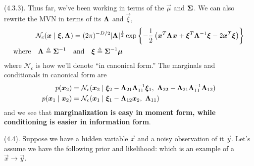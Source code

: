 \documentclass[11pt]{article}
\begin{document}
\myspace
\p {} (4.3.3). Thus far, we've been working in terms of the  $\vec\mu$ and $\matr\Sigma$. We can also rewrite the MVN in terms of its  $\matr\Lambda$ and $\vec\xi$,
\begin{align}
	\mathcal{N}_c(\vec x \mid \vec\xi, \matr\Lambda)
		&= (2\pi)^{-D/2} | \matr\Lambda |^{\onehalf} \exp\left\{  
			-\onehalf \left(   \vec{x}^T\matr\Lambda \vec x  + \vec{\xi}^T \minv{\Lambda}\vec\xi - 2 \vec{x}^T \vec\xi \right) \right\}\\
	\text{where}\quad
	\matr\Lambda \triangleq \minv{\Sigma}
	\quad&\text{and}\quad
	\vec\xi \triangleq \minv{\Sigma}\vec\mu
\end{align}
where $\mathcal{N}_c$ is how we'll denote ``in canonical form.'' The marginals and conditionals in canonical form are
\begin{align}
	p(\vec[2]{x})
		&= \mathcal{N}_c(\vec[2]{x} \mid \vec[2]{\xi} - \matr[21]{\Lambda}\matr[11]{\Lambda}^{-1}\vec[1]{\xi},~ 
			\matr[22]{\Lambda} - \matr[21]{\Lambda}\matr[11]{\Lambda}^{-1}\matr[12]{\Lambda}  )\\
	p(\vec[1]{x} \mid \vec[2]{x})
		&= \mathcal{N}_c(\vec[1]{x} \mid \vec[1]{\xi} - \matr[12]{\Lambda}\vec[2]{x}, ~ \matr[11]{\Lambda})
\end{align}
and we see that \textbf{marginalization is easy in moment form, while conditioning is easier in information form}.


\myspace
\p {} (4.4). Suppose we have a hidden variable $\vec x$ and a noisy observation of it $\vec y$. Let's assume we have the following prior and likelihood:
which is an example of a  $\vec x \rightarrow \vec y$. 
\end{document}
